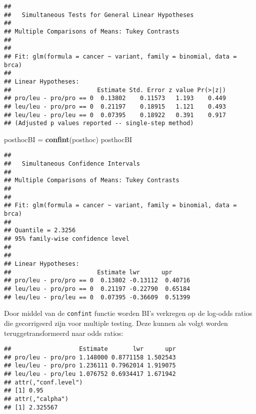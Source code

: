 \documentclass[12pt,dutch,coursenotes]{book}
\newenvironment{Shaded}{\begin{snugshade}}{\end{snugshade}}
\newcommand{\KeywordTok}[1]{\textcolor[rgb]{0.13,0.29,0.53}{\textbf{#1}}}
\newcommand{\StringTok}[1]{\textcolor[rgb]{0.31,0.60,0.02}{#1}}
\newcommand{\OperatorTok}[1]{\textcolor[rgb]{0.81,0.36,0.00}{\textbf{#1}}}
\newcommand{\NormalTok}[1]{#1}
\theoremstyle{definition}
\theoremstyle{definition}
\theoremstyle{definition}
\theoremstyle{remark}
\begin{document}
\begin{verbatim}
## 
##   Simultaneous Tests for General Linear Hypotheses
## 
## Multiple Comparisons of Means: Tukey Contrasts
## 
## 
## Fit: glm(formula = cancer ~ variant, family = binomial, data = brca)
## 
## Linear Hypotheses:
##                        Estimate Std. Error z value Pr(>|z|)
## pro/leu - pro/pro == 0  0.13802    0.11573   1.193    0.449
## leu/leu - pro/pro == 0  0.21197    0.18915   1.121    0.493
## leu/leu - pro/leu == 0  0.07395    0.18922   0.391    0.917
## (Adjusted p values reported -- single-step method)
\end{verbatim}

\begin{Shaded}
\begin{Highlighting}[]
\NormalTok{posthocBI =}\StringTok{ }\KeywordTok{confint}\NormalTok{(posthoc)}
\NormalTok{posthocBI}
\end{Highlighting}
\end{Shaded}

\begin{verbatim}
## 
##   Simultaneous Confidence Intervals
## 
## Multiple Comparisons of Means: Tukey Contrasts
## 
## 
## Fit: glm(formula = cancer ~ variant, family = binomial, data = brca)
## 
## Quantile = 2.3256
## 95% family-wise confidence level
##  
## 
## Linear Hypotheses:
##                        Estimate lwr      upr     
## pro/leu - pro/pro == 0  0.13802 -0.13112  0.40716
## leu/leu - pro/pro == 0  0.21197 -0.22790  0.65184
## leu/leu - pro/leu == 0  0.07395 -0.36609  0.51399
\end{verbatim}

Door middel van de \texttt{confint} functie worden BI's verkregen op de
log-odds ratios die gecorrigeerd zijn voor multiple testing. Deze kunnen
als volgt worden teruggetransformeerd naar odds ratios:

\begin{Shaded}
\end{Shaded}

\begin{verbatim}
##                   Estimate       lwr      upr
## pro/leu - pro/pro 1.148000 0.8771158 1.502543
## leu/leu - pro/pro 1.236111 0.7962014 1.919075
## leu/leu - pro/leu 1.076752 0.6934417 1.671942
## attr(,"conf.level")
## [1] 0.95
## attr(,"calpha")
## [1] 2.325567
\end{verbatim}
\end{document}
